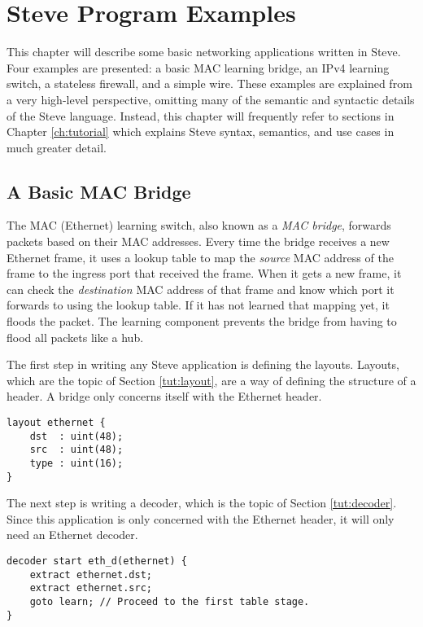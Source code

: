 \chapter{Steve Program Examples} \label{ch:examples}

This chapter will describe some basic networking applications written in Steve.
Four examples are presented: a basic MAC learning bridge, an IPv4 learning switch, a stateless firewall, and a simple wire. 
These examples are explained from a very high-level perspective, omitting many of the semantic and syntactic details of the Steve language.
Instead, this chapter will frequently refer to sections in Chapter \ref{ch:tutorial} which explains Steve syntax, semantics, and use cases in much greater detail.

\section{A Basic MAC Bridge} \label{tut:learning_switch}

The MAC (Ethernet) learning switch, also known as a \emph{MAC bridge}, forwards packets based on their MAC addresses.
Every time the bridge receives a new Ethernet frame, it uses a lookup table to map the \emph{source}
MAC address of the frame to the ingress port that received the frame.
When it gets a new frame, it can check the \emph{destination} MAC address of that frame
and know which port it forwards to using the lookup table.
If it has not learned that mapping yet, it floods the packet.
The learning component prevents the bridge from having to flood all packets like a hub.

The first step in writing any Steve application is defining the layouts.
Layouts, which are the topic of Section \ref{tut:layout}, are a way of defining the structure of a header.
A bridge only concerns itself with the Ethernet header.

\begin{codepage}
\begin{lstlisting}
layout ethernet {
	dst  : uint(48);
	src  : uint(48);
	type : uint(16);
}
\end{lstlisting}
\end{codepage}

The next step is writing a decoder, which is the topic of Section \ref{tut:decoder}.
Since this application is only concerned with the
Ethernet header, it will only need an Ethernet decoder. 

\begin{codepage}
\begin{lstlisting}
decoder start eth_d(ethernet) {
	extract ethernet.dst;
	extract ethernet.src;
	goto learn; // Proceed to the first table stage.
}
\end{lstlisting}
\end{codepage}

